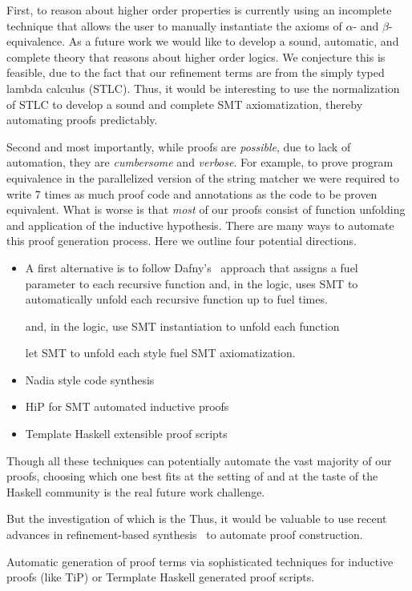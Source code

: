 First, to reason about higher order properties 
\toolname is currently using an incomplete technique 
that allows the user to manually instantiate the 
axioms of $\alpha$- and $\beta$-equivalence.
%
As a future work we would like to develop a 
sound, automatic, and complete theory that reasons about 
higher order logics. 
We conjecture this is feasible,
due to the fact that our refinement terms
are from the simply typed lambda calculus (STLC).
%
Thus, it would be interesting to use the
normalization of STLC to develop a sound
and complete SMT axiomatization, thereby
automating proofs predictably.


Second and most importantly, 
while proofs are \emph{possible}, 
due to lack of automation, they are
\emph{cumbersome} and \emph{verbose}.
%
For example, to prove program equivalence in the parallelized version 
of the string matcher we were required to write 7 times 
as much proof code and annotations as the code to be proven equivalent. 
%
What is worse is that \emph{most} of our proofs consist of 
function unfolding and application of the inductive hypothesis.
There are many ways to automate this proof generation process. Here 
we outline four potential directions. 
\begin{itemize}
\item A first alternative is to follow Dafny's~\cite{dafny} approach
that assigns a fuel parameter to each recursive function and, 
in the logic, uses SMT to automatically unfold each recursive function up to fuel times. 
%


 
and, in the logic, use SMT instantiation to unfold each function 

 let SMT to unfold each   style fuel SMT axiomatization.
\item Nadia style code synthesis 
\item HiP for SMT automated inductive proofs
\item Template Haskell extensible proof scripts
\end{itemize}

% 
Though all these techniques can potentially automate the vast majority of 
our proofs, choosing which one best fits at the setting of \toolname and 
at the taste of the Haskell community is the real future work challenge.

But the investigation of which is 
the  
%
Thus, it would be valuable to use recent
advances in refinement-based synthesis~\cite{polikarpova16}
to automate proof construction.


Automatic generation of proof terms via sophisticated 
techniques for inductive proofs (like TiP)
or Termplate Haskell generated proof scripts. 


%



